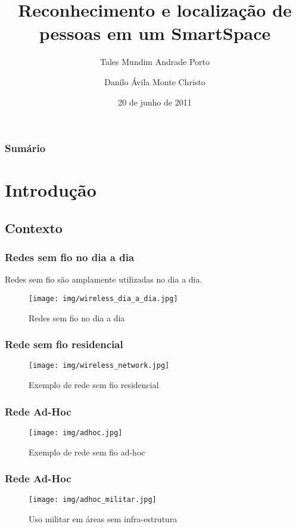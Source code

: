 \documentclass{beamer}
\title{Reconhecimento e localização de pessoas em um SmartSpace}
\author{Tales Mundim Andrade Porto}
\author{Danilo Ávila Monte Christo}
\institute[UnB]
{
    Instituto de Ciências Exatas\\
    Departamento de Ciência da Computação\\
    Universidade de Brasília
}
\date{20 de junho de 2011}
\begin{document}
\begin{frame}
\titlepage
\end{frame}


\begin{frame}
\frametitle{Sumário}
\tableofcontents
\end{frame}


\section{Introdução}

\subsection{Contexto}
\begin{frame}
    \frametitle{Redes sem fio no dia a dia}
    Redes sem fio são amplamente utilizadas no dia a dia.
    
    \begin{figure}[h]
    \centering \texttt{[image: img/wireless\_dia\_a\_dia.jpg]}
    \caption{Redes sem fio no dia a dia}
    \label{wireless_dia_a_dia} 
    \end{figure}
\end{frame}

\begin{frame}
    \frametitle{Rede sem fio residencial}
    
    \begin{figure}[h]
    \centering \texttt{[image: img/wireless\_network.jpg]}
    \caption{Exemplo de rede sem fio residencial}
    \label{wireless_residencial} 
    \end{figure}
\end{frame}

\begin{frame}
    \frametitle{Rede Ad-Hoc}
    
    \begin{figure}[h]
    \centering \texttt{[image: img/adhoc.jpg]}
    \caption{Exemplo de rede sem fio ad-hoc}
    \label{wireless_ad_hoc}
    \end{figure}
\end{frame}

\begin{frame}
    \frametitle{Rede Ad-Hoc}
    
    \begin{figure}[h]
    \centering \texttt{[image: img/adhoc\_militar.jpg]}
    \caption{Uso militar em áreas sem infra-estrutura}
    \label{adhoc_militar} 
    \end{figure}
\end{frame}
\end{document}
